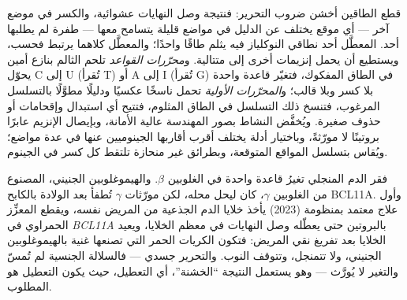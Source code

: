 \begin{proposition}\label{prop:b3:genetic-engineering:editors}
قطع الطاقين أخشن ضروب التحرير: فنتيجة وصل النهايات
عشوائية، والكسر في موضع آخر --- أي موقع \emph{} يختلف
عن الدليل في مواضع قليلة يتسامح معها  --- طفرة
لم يطلبها أحد.  المعطَّل أحد نطاقي النوكلياز فيه
يثلم طاقًا واحدًا؛ والمعطَّل كلاهما يرتبط فحسب، ويستطيع أن
يحمل إنزيمات أخرى إلى متتالية. و\emph{محرّرات القواعد} تلحم
 الثالم بنازع أمين يحوّل C إلى U (تُقرأ T) أو A إلى I
(تُقرأ G) في الطاق المفكوك، فتغيّر قاعدة واحدة بلا كسر
وبلا قالب؛ و\emph{المحرّرات الأولية} تحمل ناسخًا
عكسيًا ودليلًا مطوَّلًا بالتسلسل المرغوب، فتنسخ
ذلك التسلسل في الطاق المثلوم، فتتيح أي استبدال
وإقحامات أو حذوف صغيرة. ويُخفَّض النشاط 
بصور  المهندسة عالية الأمانة، وبإيصال الإنزيم
عابرًا بروتينًا لا مورّثةً، وباختيار أدلة يختلف
أقرب أقاربها الجينوميين عنها في عدة مواضع؛ ويُقاس
بتسلسل المواقع المتوقعة، وبطرائق غير منحازة تلتقط
كل كسر في الجينوم.
\end{proposition}

\begin{example}[شفاء]\label{ex:b3:genetic-engineering:sickle}
فقر الدم المنجلي تغيرُ قاعدة واحدة في الغلوبين $\beta$. والهيموغلوبين
الجنيني، المصنوع من الغلوبين $\gamma$، كان ليحل محله، لكن
مورّثات $\gamma$ تُطفأ بعد الولادة بالكابح BCL11A.
وأول علاج معتمد بمنظومة  (2023) يأخذ خلايا الدم الجذعية
من المريض نفسه، ويقطع المعزِّز الحمراوي في \emph{BCL11A} بالبروتين  حتى
يعطّله وصل النهايات في معظم الخلايا، ويعيد الخلايا بعد
تفريغ نقي المريض: فتكون الكريات الحمر التي تصنعها غنية
بالهيموغلوبين الجنيني، ولا تتمنجل، وتتوقف النوب. والتحرير
جسدي --- فالسلالة الجنسية لم تُمسّ والتغير لا يُورَّث
--- وهو يستعمل النتيجة ``الخشنة''، أي التعطيل، حيث يكون التعطيل
هو المطلوب.
\end{example}

